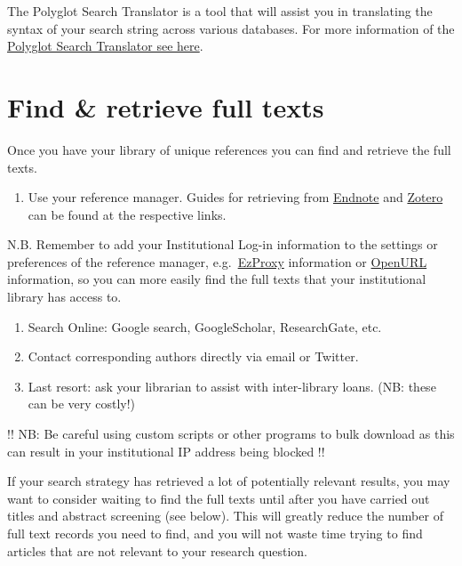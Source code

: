 \documentclass[
]{book}
\providecommand{\tightlist}{%
  \setlength{\itemsep}{0pt}\setlength{\parskip}{0pt}}
\begin{document}
The Polyglot Search Translator is a tool that will assist you in translating the syntax of your search string across various databases. For more information of the \href{https://sr-accelerator.com/\#/polyglot}{Polyglot Search Translator see here}.

\hypertarget{find-retrieve-full-texts}{%
\section{Find \& retrieve full texts}\label{find-retrieve-full-texts}}

Once you have your library of unique references you can find and retrieve the full texts.

\begin{enumerate}
\def\labelenumi{\arabic{enumi}.}
\tightlist
\item
  Use your reference manager. Guides for retrieving from \href{https://subjectguides.library.american.edu/c.php?g=479020\&p=3324236}{Endnote} and \href{https://www.zotero.org/support/locate}{Zotero} can be found at the respective links.
\end{enumerate}

N.B. Remember to add your Institutional Log-in information to the settings or preferences of the reference manager, e.g.~\href{https://ezproxy-db.appspot.com/}{EzProxy} information or \href{https://www.zotero.org/support/locate/openurl_resolvers}{OpenURL} information, so you can more easily find the full texts that your institutional library has access to.

\begin{enumerate}
\def\labelenumi{\arabic{enumi}.}
\setcounter{enumi}{1}
\item
  Search Online: Google search, GoogleScholar, ResearchGate, etc.
\item
  Contact corresponding authors directly via email or Twitter.
\item
  Last resort: ask your librarian to assist with inter-library loans. (NB: these can be very costly!)
\end{enumerate}

!! NB: Be careful using custom scripts or other programs to bulk download as this can result in your institutional IP address being blocked !!

If your search strategy has retrieved a lot of potentially relevant results, you may want to consider waiting to find the full texts until after you have carried out titles and abstract screening (see below). This will greatly reduce the number of full text records you need to find, and you will not waste time trying to find articles that are not relevant to your research question.
\end{document}
